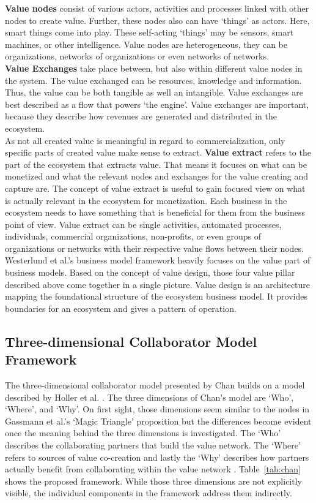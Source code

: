 		\textbf{Value nodes} consist of various actors, activities and processes linked with other nodes to create value. Further, these nodes also can have `things' as actors. Here, smart things come into play. These self-acting `things' may be sensors, smart machines, or other intelligence. Value nodes are heterogeneous, they can be organizations, networks of organizations or even networks of networks.\\
		\textbf{Value Exchanges} take place between, but also within different value nodes in the system. The value exchanged can be resources, knowledge and information. Thus, the value can be both tangible as well an intangible. Value exchanges are best described as a flow that powers `the engine'. Value exchanges are important, because they describe how revenues are generated and distributed in the ecosystem.\\
		As not all created value is meaningful in regard to commercialization, only specific parts of created value make sense to extract. \textbf{Value extract} refers to the part of the ecosystem that extracts value. That means it focuses on what can be monetized and what the relevant nodes and exchanges for the value creating and capture are. The concept of value extract is useful to gain focused view on what is actually relevant in the ecosystem for monetization. Each business in the ecosystem needs to have something that is beneficial for them from the business point of view. Value extract can be single activities, automated processes, individuals, commercial organizations, non-profits, or even groups of organizations or networks with their respective value flows between their nodes.\\
		Westerlund et al.'s business model framework heavily focuses on the value part of business models. Based on the concept of value design, those four value pillar described above come together in a single picture. Value design is an architecture mapping the foundational structure of the ecosystem business model. It provides boundaries for an ecosystem and gives a pattern of operation.
	\vspace{-2em}
	\subsection{Three-dimensional Collaborator Model Framework}
	\vspace{-1em}	
		The three-dimensional collaborator model presented by Chan \cite{chan} builds on a model described by Holler et al. \cite{holler}. The three dimensions of Chan's model are `Who', `Where', and `Why'. On first sight, those dimensions seem similar to the nodes in Gassmann et al.'s `Magic Triangle' proposition but the differences become evident once the meaning behind the three dimensions is investigated. The `Who' describes the collaborating partners that build the value network. The `Where' refers to sources of value co-creation and lastly the `Why' describes how partners actually benefit from collaborating within the value network \cite{chan}. Table~\ref{tab:chan} shows the proposed framework. While those three dimensions are not explicitly visible, the individual components in the framework address them indirectly.

